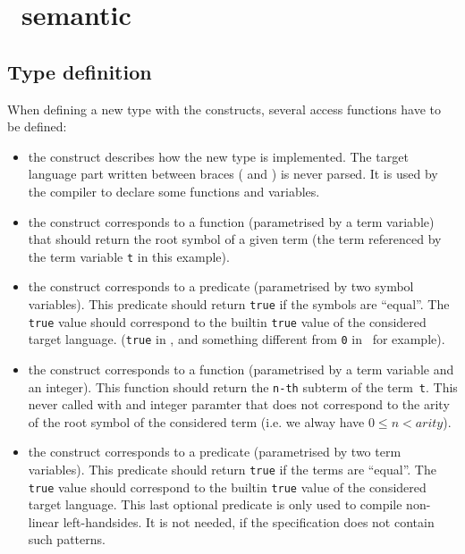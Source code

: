 \section{\TOM\ semantic}

\subsection{Type definition}\label{typedef}

\noindent
When defining a new type with the  constructs,
several access functions have to be defined:
\begin{itemize}
\item\label{implement} the  construct describes how the new type is 
  implemented. The target language part written between braces
  ( and ) is never parsed. It is used by
  the compiler to declare some functions and variables.

\item\label{getfs} the  construct corresponds to a
  function (parametrised by a term variable) that should return the
  root symbol of a given term (the term referenced by the term
  variable \texttt{t} in this example). 

\item\label{cmpfs} the  construct corresponds to a
  predicate (parametrised by two symbol variables).
  This predicate should return \texttt{true} if the symbols are
  ``equal''. The \texttt{true} value should correspond to the 
  builtin \texttt{true} value of the considered target language.
  (\texttt{true} in \Java, and something different from \texttt{0} in
  \Clang\ for example). 

\item\label{gets} the  construct corresponds to a
  function (parametrised by a term variable and an integer).
  This function should return the \texttt{n-th} subterm of the
  term~\texttt{t}. This never called with and integer paramter that
  does not correspond to the arity of the root symbol of the
  considered term (i.e. we alway have $0 \leq n < arity$).

\item\label{equals} the  construct corresponds to a
  predicate (parametrised by two term variables).
  This predicate should return \texttt{true} if the terms are
  ``equal''. The \texttt{true} value should correspond to the 
  builtin \texttt{true} value of the considered target language.
  This last optional predicate is only used to compile non-linear 
  left-handsides. It is not needed, if the specification does not
  contain such patterns.
\end{itemize}


